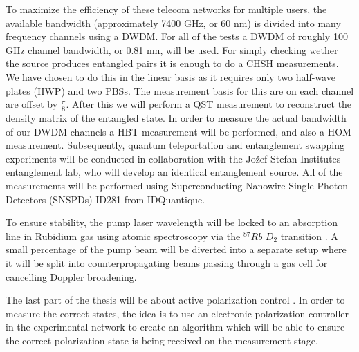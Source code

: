 \documentclass{article}
\theoremstyle{mytheoremstyle}
\theoremstyle{mytheoremstyle}
\theoremstyle{myproblemstyle}
\begin{document}
To maximize the efficiency of these telecom networks for multiple users, the available bandwidth (approximately 7400 GHz, or 60 nm)
is divided into many frequency channels using a DWDM.
For all of the tests a DWDM of roughly 100 GHz channel bandwidth, or 0.81 nm, will be used. For simply checking wether the source
produces entangled pairs it is enough to do a CHSH measurements. We have chosen to do this in the linear basis as it requires
only two half-wave plates (HWP) and two PBSs. The measurement basis for this are on each channel are offset by $\frac{\pi}{8}$. After this
we will perform a QST measurement to reconstruct \cite{James_Kwiat_Munro_White_2001} the density matrix of the entangled state.
In order to measure the actual bandwidth of our DWDM channels a HBT measurement will be performed, and also a HOM measurement.
Subsequently, quantum teleportation \cite{Bouwmeester_Pan_Mattle_Eibl_Weinfurter_Zeilinger_1997}
and entanglement swapping \cite{Jennewein_Weihs_Pan_Zeilinger_2001} experiments will be conducted in collaboration with the Jožef Stefan Institutes
entanglement lab, who will develop an identical entanglement source.
All of the measurements will be performed using Superconducting Nanowire Single Photon Detectors (SNSPDs) ID281 from IDQuantique.

To ensure stability, the pump laser wavelength will be locked to an absorption line in Rubidium gas using atomic spectroscopy
via the $^{87}Rb$ $D_2$ transition \cite{metger2017sas}. A small percentage of the pump beam will be diverted into a separate
setup where it will be split into counterpropagating beams passing through a gas cell for cancelling Doppler broadening.

The last part of the thesis will be about active polarization control %
\cite{CCSHDCDRS}. In order to measure the correct states, the
idea is to use an electronic polarization controller in the experimental network to create an algorithm which will be able to
ensure the correct polarization state is being received on the measurement stage.
\end{document}
